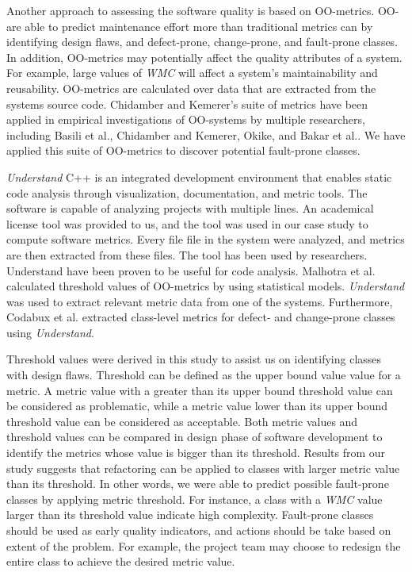 Another approach to assessing the software quality is based on OO-metrics\cite{codabux2016technical}. OO-are able to predict maintenance effort more than traditional metrics can\cite{li1993object} by identifying design flaws, and defect-prone, change-prone, and fault-prone classes\cite{basili1996validation}. In addition, OO-metrics may potentially affect the quality attributes of a system. For example, large values of \textit{WMC} will affect a system's maintainability and reusability\cite{quenelobject}. OO-metrics are calculated over data that are extracted from the systems source code. Chidamber and Kemerer's suite of metrics have been applied in empirical investigations of OO-systems by multiple researchers, including Basili et al.\cite{basili1996validation}, Chidamber and Kemerer\cite{chidamber1994metrics}, Okike\cite{okike2010pedagogical}, and Bakar et al.\cite{bakar2014analysis}. We have applied this suite of OO-metrics to discover potential fault-prone classes.

\textit{Understand} C++ is an integrated development environment that enables static code analysis through visualization, documentation, and metric tools. The software is capable of analyzing projects with multiple lines. An academical license tool was provided to us, and the tool was used in our case study to compute software metrics. Every file file in the system were analyzed, and metrics are then extracted from these files. The tool has been used by researchers. Understand have been proven to be useful for code analysis. Malhotra et al.\cite{malhotra2015fault} calculated threshold values of OO-metrics by using statistical models. \textit{Understand} was used to extract relevant metric data from one of the systems. Furthermore, Codabux et al.\cite{codabux2016technical} extracted class-level metrics for defect- and change-prone classes using \textit{Understand}.

Threshold values were derived in this study to assist us on identifying classes with design flaws. Threshold can be defined as the upper bound value value for a metric. A metric value with a greater than its upper bound threshold value can be considered as problematic, while a metric value lower than its upper bound threshold value can be considered as acceptable. Both metric values and threshold values can be compared in design phase of software development to identify the metrics whose value is bigger than its threshold. Results from our study suggests that refactoring can be applied to classes with larger metric value than its threshold. In other words, we were able to predict possible fault-prone classes by applying metric threshold. For instance, a class with a \textit{WMC} value larger than its threshold value indicate high complexity. Fault-prone classes should be used as early quality indicators, and actions should be take based on extent of the problem. For example, the project team may choose to redesign the entire class to achieve the desired metric value. 


